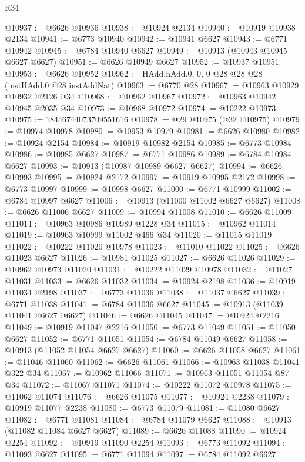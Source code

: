 \begin{lexlean}{R34}
\begin{coremodule}
@10937 := @6626 @10936
@10938 := @10924 @2134
@10940 := @10919 @10938 @2134
@10941 := @6773 @10940
@10942 := @10941 @6627
@10943 := @6771 @10942
@10945 := @6784 @10940 @6627
@10949 := @10913 (@10943 @10945 @6627 @6627)
@10951 := @6626 @10949 @6627
@10952 := @10937 @10951
@10953 := @6626 @10952
@10962 := HAdd.hAdd.{0, 0, 0} @28 @28 @28 (instHAdd.{0} @28 instAddNat)
@10963 := @6770 @28
@10967 := @10963 @10929 @10932 @2126 @34
@10968 := @10962 @10967
@10972 := @10963 @10942 @10945 @2035 @34
@10973 := @10968 @10972
@10974 := @10222 @10973
@10975 := 18446744073709551616
@10978 := @29 @10975 (@32 @10975)
@10979 := @10974 @10978
@10980 := @10953 @10979
@10981 := @6626 @10980
@10982 := @10924 @2154
@10984 := @10919 @10982 @2154
@10985 := @6773 @10984
@10986 := @10985 @6627
@10987 := @6771 @10986
@10989 := @6784 @10984 @6627
@10993 := @10913 (@10987 @10989 @6627 @6627)
@10994 := @6626 @10993
@10995 := @10924 @2172
@10997 := @10919 @10995 @2172
@10998 := @6773 @10997
@10999 := @10998 @6627
@11000 := @6771 @10999
@11002 := @6784 @10997 @6627
@11006 := @10913 (@11000 @11002 @6627 @6627)
@11008 := @6626 @11006 @6627
@11009 := @10994 @11008
@11010 := @6626 @11009
@11014 := @10963 @10986 @10989 @1228 @34
@11015 := @10962 @11014
@11019 := @10963 @10999 @11002 @466 @34
@11020 := @11015 @11019
@11022 := @10222 @11020 @10978
@11023 := @11010 @11022
@11025 := @6626 @11023 @6627
@11026 := @10981 @11025
@11027 := @6626 @11026
@11029 := @10962 @10973 @11020
@11031 := @10222 @11029 @10978
@11032 := @11027 @11031
@11033 := @6626 @11032
@11034 := @10924 @2198
@11036 := @10919 @11034 @2198
@11037 := @6773 @11036
@11038 := @11037 @6627
@11039 := @6771 @11038
@11041 := @6784 @11036 @6627
@11045 := @10913 (@11039 @11041 @6627 @6627)
@11046 := @6626 @11045
@11047 := @10924 @2216
@11049 := @10919 @11047 @2216
@11050 := @6773 @11049
@11051 := @11050 @6627
@11052 := @6771 @11051
@11054 := @6784 @11049 @6627
@11058 := @10913 (@11052 @11054 @6627 @6627)
@11060 := @6626 @11058 @6627
@11061 := @11046 @11060
@11062 := @6626 @11061
@11066 := @10963 @11038 @11041 @322 @34
@11067 := @10962 @11066
@11071 := @10963 @11051 @11054 @87 @34
@11072 := @11067 @11071
@11074 := @10222 @11072 @10978
@11075 := @11062 @11074
@11076 := @6626 @11075
@11077 := @10924 @2238
@11079 := @10919 @11077 @2238
@11080 := @6773 @11079
@11081 := @11080 @6627
@11082 := @6771 @11081
@11084 := @6784 @11079 @6627
@11088 := @10913 (@11082 @11084 @6627 @6627)
@11089 := @6626 @11088
@11090 := @10924 @2254
@11092 := @10919 @11090 @2254
@11093 := @6773 @11092
@11094 := @11093 @6627
@11095 := @6771 @11094
@11097 := @6784 @11092 @6627

\end{coremodule}
\end{lexlean}
